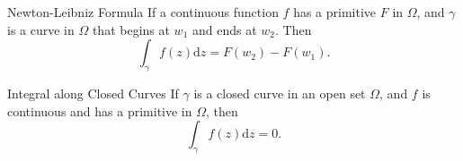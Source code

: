 \begin{theorem}{Newton-Leibniz Formula}{}
  If a continuous function $f$ has a primitive $F$ in $\Omega$,
  and $\gamma$ is a curve in $\Omega$ that begins at $w_1$ and
  ends at $w_2$. Then
  \begin{equation}
    \int_{\gamma}f(z)\mathrm{d} z = F(w_2) - F(w_1).
  \end{equation}
\end{theorem}

\begin{corollary}{Integral along Closed Curves}{}
  If $\gamma$ is a closed curve in an open set $\Omega$,
  and $f$ is continuous and has a primitive in $\Omega$, then
  \begin{equation}
    \int_{\gamma} f(z) \mathrm{d} z = 0.
  \end{equation}
\end{corollary}



